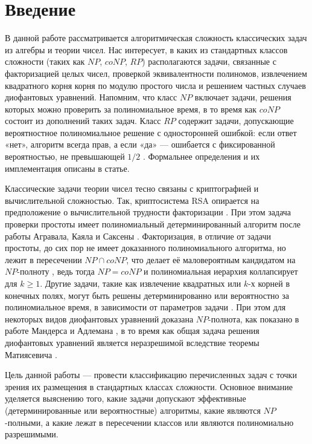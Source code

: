 \documentclass[a4paper,12pt]{article}
\begin{document}
\newpage
\tableofcontents
\newpage

\section{Введение}
\hspace{0.5cm} В данной работе рассматривается алгоритмическая сложность классических задач из алгебры и теории чисел. Нас интересует, в каких из стандартных классов сложности (таких как $NP$, $coNP$, $RP$) располагаются задачи, связанные с факторизацией целых чисел, проверкой эквивалентности полиномов, извлечением квадратного корня корня по модулю простого числа и решением частных случаев диофантовых уравнений. Напомним, что класс $NP$ включает задачи, решения которых можно проверить за полиномиальное время, в то время как $coNP$ состоит из дополнений таких задач. Класс $RP$ содержит задачи, допускающие вероятностное полиномиальное решение с односторонней ошибкой: если ответ «нет», алгоритм всегда прав, а если «да» — ошибается с фиксированной вероятностью, не превышающей $1/2$ \cite{Papadimitriou1994}. Формальнее определения и их имплементация описаны в статье.

Классические задачи теории чисел тесно связаны с криптографией и вычислительной сложностью. Так, криптосистема RSA опирается на предположение о вычислительной трудности факторизации \cite{RSA1978}. При этом задача проверки простоты имеет полиномиальный детерминированный алгоритм после работы Агравала, Каяла и Саксены \cite{AKS2004}. Факторизация, в отличие от задачи простоты, до сих пор не имеет доказанного полиномиального алгоритма, но лежит в пересечении $NP \cap coNP$, что делает её маловероятным кандидатом на $NP$-полноту \cite{CrandallPomerance2005}, ведь тогда $NP = coNP$ и полиномиальная иерархия коллапсирует для $k \geq 1$. Другие задачи, такие как извлечение квадратных или $k$-х корней в конечных полях, могут быть решены детерминированно или вероятностно за полиномиальное время, в зависимости от параметров задачи \cite{Shoup1990}. При этом для некоторых видов диофантовых уравнений доказана $NP$-полнота, как показано в работе Мандерса и Адлемана \cite{MandersAdleman1980}, в то время как общая задача решения диофантовых уравнений является неразрешимой вследствие теоремы Матиясевича \cite{Matiyasevich1970}.

Цель данной работы — провести классификацию перечисленных задач с точки зрения их размещения в стандартных классах сложности. Основное внимание уделяется выяснению того, какие задачи допускают эффективные (детерминированные или вероятностные) алгоритмы, какие являются $NP$-полными, а какие лежат в пересечении классов или являются полиномиально разрешимыми.
\end{document}
